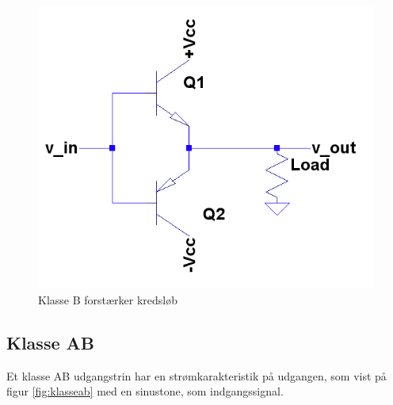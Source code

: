 \begin{figure}[h]
\centering
\includegraphics[scale=.35]{indledende_analyse/klasser/classb.png}
\caption{Klasse B forstærker kredsløb}
\label{fig:classb}
\end{figure}

\subsection{Klasse AB}

Et klasse AB udgangstrin har en strømkarakteristik på udgangen, som vist på figur \ref{fig:klasseab} med en sinustone, som indgangssignal. 

